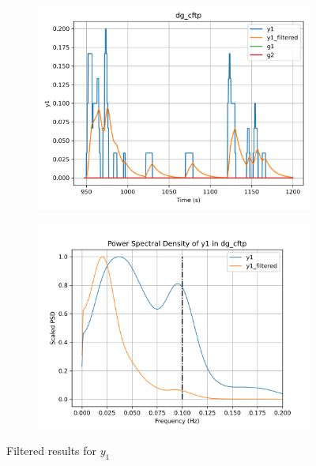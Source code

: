 \begin{figure}[H]

\begin{minipage}{0.49\textwidth}
        \begin{figure}[H]
                \centering
                \includegraphics[width = \textwidth]{./figs/tst_filt/dg_cftp/y1.png}
        \end{figure}
\end{minipage}
\begin{minipage}{0.49\textwidth}
        \begin{figure}[H]
                \centering
                \includegraphics[width = \textwidth]{./figs/tst_filt/dg_cftp/y1_psd.png}
        \end{figure}
\end{minipage}
\caption{Filtered results for $y_1$}

\end{figure}
